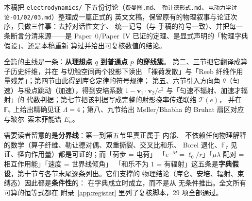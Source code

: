 \begin{cnread}[title={\textbf{中文导读（全篇）}}]
本稿把 \texttt{electrodynamics/} 下五份讨论（\texttt{费曼图.md}、
\texttt{勒让德形式.md}、\texttt{电动力学讨论-01/02/03.md}）整理成一篇正式的
英文文稿，保留原有的物理叙事与论证次序，只做三件事：去掉对话性文字、
统一记号（与 \AEG{} 手稿的符号一致）、并把每一条断言分清来源——是
Paper~0/Paper~IV 已证的定理、是显式声明的「物理字典假设」、还是本稿重新
算过并给出可复核数值的结论。

全篇的主线是一条：\textbf{从理想点 $q$ 到普通点 $p$ 的穿线簇}。
第二、三节把它翻译成算子历史纤维，并在 \ACS{} 与切触空间两个投影下读出
「裸荷发散」与「Reeb 纤维作用量残差」；第四节由此得到库仑定律的符号规律；
第五、六节引入方向角 $\theta$（匀速）与极点跳动（加速），得到安培系数
$1-\mathbf v_1\!\cdot\!\mathbf v_2/c^2$ 与「匀速不辐射、加速才辐射」的
代数判据；第七节把该判据写成完整的射影挠率传递联络 $\mathcal T(e)$，
并在 $\mathbb F_7$ 上给出精确见证 $\Lambda=4$；第八、九节给出
M\o ller/Bhabha 的 Bruhat 扇区对应与玻尔–索末菲能谱 $E_n$。

需要读者留意的是\textbf{分界线}：第一到第五节里真正属于 \AEG{} 内部、
不依赖任何物理解释的数学（算子纤维、勒让德对偶、双重撕裂、交叉比和乐、
Borel 退化、$\mathbb F_7$ 见证、径向作用量）都是可证的；而「荷步 = 电荷」
「$e^{-M}=\ell_0/r$」「$\mu\lambda$ 配对 = 相互作用能」「速度 = 世界线倾角」
「和乐不为 $1$ = 有辐射」这五条是\textbf{字典假设}，第十节与各节末尾逐条列出。它们支撑的
物理结论（库仑、安培、辐射、束缚态）因此都是\textbf{条件性}的：
在字典成立时成立，而不是从 \AEG{} 无条件推出。全文所有可算的恒等式都在
附录~\ref{app:register} 里列了复核脚本，29 项全部通过。
\end{cnread}

\newpage
